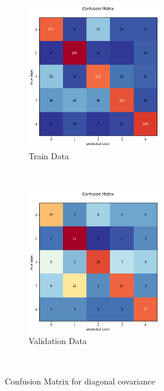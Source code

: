 \begin{figure}[!t]
    \centering
    \begin{subfigure}[t]{0.5\textwidth}
        \centering
        \includegraphics[height=2.5in]{Dataset_2a/train1_diag.png}
        \caption{Train Data}
    \end{subfigure}%
    ~ 
    \begin{subfigure}[t]{0.5\textwidth}
        \centering
        \includegraphics[height=2.5in]{Dataset_2a/test1_diag.png} 
        \caption{Validation Data}
    \end{subfigure}%
    ~
    \caption{Confusion Matrix for diagonal covariance}
    \label{fig:28}
\end{figure}

